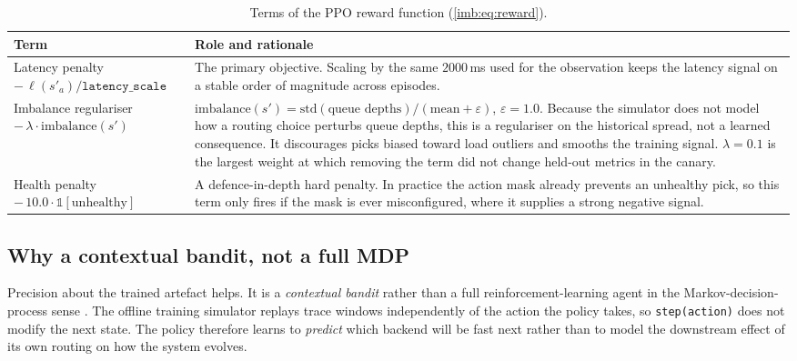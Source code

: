 \begin{table}[H]
  \centering
  \caption[Terms of the PPO reward function]{Terms of the PPO reward function (\cref{imb:eq:reward}).}
  \label{tab:imb:reward}
  \small
  \begin{tabularx}{\linewidth}{@{}p{3.7cm}Y@{}}
    \toprule
    \headrow
    \textbf{Term} & \textbf{Role and rationale} \\
    \midrule
    Latency penalty
      $-\,\ell(s'_a)/\texttt{latency\_scale}$
      & The primary objective. Scaling by the same $2000$\,ms used for the
        observation keeps the latency signal on a stable order of magnitude
        across episodes. \\
    \addlinespace
    Imbalance regulariser
      $-\,\lambda\cdot\mathrm{imbalance}(s')$
      & $\mathrm{imbalance}(s')=\mathrm{std}(\text{queue depths})/(\mathrm{mean}+\varepsilon)$,
        $\varepsilon=1.0$. Because the simulator does not model how a routing
        choice perturbs queue depths, this is a regulariser on the historical
        spread, not a learned consequence. It discourages picks biased toward
        load outliers and smooths the training signal. $\lambda=0.1$ is the
        largest weight at which removing the term did not change held-out metrics
        in the canary. \\
    \addlinespace
    Health penalty
      $-\,10.0\cdot\mathbb{1}[\text{unhealthy}]$
      & A defence-in-depth hard penalty. In practice the action mask already
        prevents an unhealthy pick, so this term only fires if the mask is ever
        misconfigured, where it supplies a strong negative signal. \\
    \bottomrule
  \end{tabularx}
\end{table}

\subsection{Why a contextual bandit, not a full MDP}\label{imb:ppo_mdp}

Precision about the trained artefact helps. It is a \emph{contextual bandit}
rather than a full reinforcement-learning agent in the Markov-decision-process
sense \cite{sutton2018rl}. The offline training simulator replays trace windows
independently of the action the policy takes, so \texttt{step(action)} does not
modify the next state. The policy therefore learns to \emph{predict} which backend
will be fast next rather than to model the downstream effect of its own routing on
how the system evolves.

